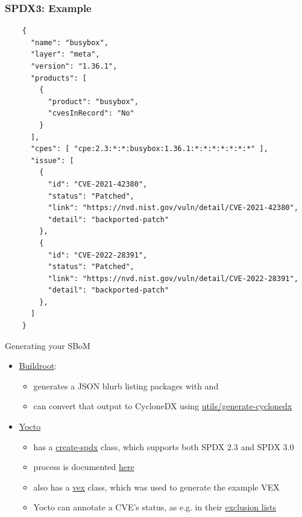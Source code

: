 \begin{frame}[fragile]
  \frametitle{SPDX3: Example}
    \begin{verbatim}
    {
      "name": "busybox",
      "layer": "meta",
      "version": "1.36.1",
      "products": [
        {
          "product": "busybox",
          "cvesInRecord": "No"
        }
      ],
      "cpes": [ "cpe:2.3:*:*:busybox:1.36.1:*:*:*:*:*:*:*" ],
      "issue": [
        {
          "id": "CVE-2021-42380",
          "status": "Patched",
          "link": "https://nvd.nist.gov/vuln/detail/CVE-2021-42380",
          "detail": "backported-patch"
        },
        {
          "id": "CVE-2022-28391",
          "status": "Patched",
          "link": "https://nvd.nist.gov/vuln/detail/CVE-2022-28391",
          "detail": "backported-patch"
        },
      ]
    }
    \end{verbatim}
\end{frame}

\begin{frame}{Generating your SBoM}
  \begin{itemize}
    \item \href{https://buildroot.org/}{Buildroot}:
    \begin{itemize}
      \item generates a JSON blurb listing packages with  and 
      \item can convert that output to CycloneDX using
            \href{https://github.com/buildroot/buildroot/blob/master/utils/generate-cyclonedx}{utils/generate-cyclonedx}
    \end{itemize}
    \item \href{https://www.yoctoproject.org/}{Yocto}
    \begin{itemize}
      \item has a \href{https://github.com/openembedded/openembedded-core/blob/master/meta/classes/create-spdx.bbclass}{create-spdx} class,
            which supports both SPDX 2.3 and SPDX 3.0
      \item process is documented \href{https://docs.yoctoproject.org/dev/dev-manual/sbom.html}{here}
      \item also has a \href{https://github.com/openembedded/openembedded-core/blob/master/meta/classes/vex.bbclass}{vex} class,
            which was used to generate the example VEX
      \item Yocto can annotate a CVE's status, as e.g. in their
            \href{https://github.com/openembedded/openembedded-core/blob/master/meta/recipes-kernel/linux/cve-exclusion.inc}{exclusion lists}
    \end{itemize}
  \end{itemize}
\end{frame}

